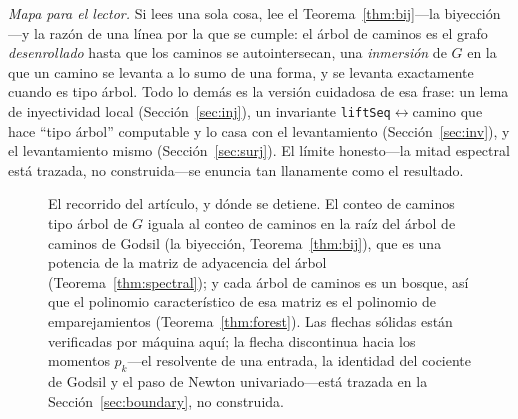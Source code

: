 \documentclass[11pt]{article}
\newcommand{\lean}[1]{\texttt{#1}}
\begin{document}
\noindent\emph{Mapa para el lector.} Si lees una sola cosa, lee el Teorema~\ref{thm:bij}---la
biyecci\'on---y la raz\'on de una l\'inea por la que se cumple: el \'arbol de caminos es el grafo
\emph{desenrollado} hasta que los caminos se autointersecan, una \emph{inmersi\'on} de $G$ en la que un
camino se levanta a lo sumo de una forma, y se levanta exactamente cuando es tipo \'arbol. Todo lo
dem\'as es la versi\'on cuidadosa de esa frase: un lema de inyectividad local (Secci\'on~\ref{sec:inj}),
un invariante \lean{liftSeq}$\leftrightarrow$camino que hace ``tipo \'arbol'' computable y lo casa con
el levantamiento (Secci\'on~\ref{sec:inv}), y el levantamiento mismo (Secci\'on~\ref{sec:surj}). El
l\'imite honesto---la mitad espectral est\'a trazada, no construida---se enuncia tan llanamente como el
resultado.

\begin{figure}[h]
\centering
{}
\caption{El recorrido del art\'iculo, y d\'onde se detiene. El conteo de caminos tipo \'arbol de $G$
iguala al conteo de caminos en la ra\'iz del \'arbol de caminos de Godsil (la biyecci\'on,
Teorema~\ref{thm:bij}), que es una potencia de la matriz de adyacencia del \'arbol
(Teorema~\ref{thm:spectral}); y cada \'arbol de caminos es un bosque, as\'i que el polinomio
caracter\'istico de esa matriz es el polinomio de emparejamientos (Teorema~\ref{thm:forest}). Las
flechas s\'olidas est\'an verificadas por m\'aquina aqu\'i; la flecha discontinua hacia los momentos
$p_k$---el resolvente de una entrada, la identidad del cociente de Godsil y el paso de Newton
univariado---est\'a trazada en la Secci\'on~\ref{sec:boundary}, no construida.}
\label{fig:spine}
\end{figure}
\end{document}
